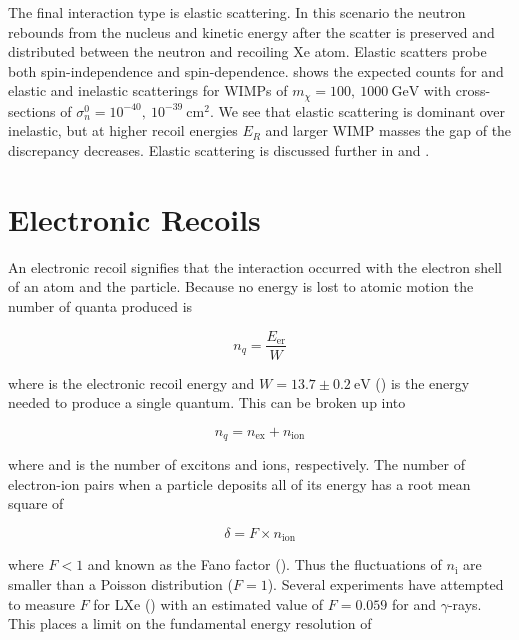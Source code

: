 The final interaction type is elastic scattering.  In this scenario the neutron rebounds from the nucleus and kinetic energy after the
scatter is preserved and distributed between the neutron and recoiling Xe atom.  Elastic scatters probe both spin-independence
and spin-dependence.   shows the expected counts for  and  elastic and
inelastic scatterings for WIMPs of $m_{\chi} = 100,\ 1000\ \mathrm{GeV}$ with cross-sections of
$\sigma_{n}^{0} = 10^{-40},\ 10^{-39}\ \mathrm{cm^{2}}$.  We see that elastic scattering is dominant over inelastic, but at higher recoil
energies $E_{R}$ and larger WIMP masses the gap of the discrepancy decreases.  Elastic scattering is discussed further in
 and \chapref{}.


\section{Electronic Recoils}
\label{sec:er}
An electronic recoil signifies that the interaction occurred with the electron shell of an atom and the particle.  Because no energy
is lost to atomic motion the number of quanta produced is

\begin{equation}
n_{q} = \frac{E_{\mathrm{er}}}{W}
\label{eq:nquant_er}
\end{equation}

\noindent where \energyer is the electronic recoil energy
and $W = 13.7 \pm 0.2\ \mathrm{eV}$ () is the energy needed to produce a single quantum.  This can be broken up into

\begin{equation}
n_{q} = n_{\mathrm{ex}} + n_{\mathrm{ion}}
\label{eq:quanta}
\end{equation}

\noindent where \nex and \nion is the number of excitons and ions, respectively.  The number of electron-ion pairs when a particle
deposits all of its energy has a root mean square of

\begin{equation}
\delta = F \times n_{\mathrm{ion}}
\label{eq:fano}
\end{equation}

\noindent where $F < 1$ and known as the Fano factor ().  Thus the fluctuations of $n_{\mathrm{i}}$ are smaller than a
Poisson distribution ($F = 1$).  Several experiments have attempted to measure $F$ for LXe () with an
estimated value of $F = 0.059$ for \electron and $\gamma$-rays.  This places a limit on the fundamental energy resolution of

